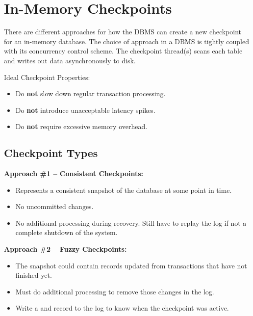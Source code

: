 \documentclass[11pt]{article}
\begin{document}
\maketitle
\thispagestyle{plain}

\section{In-Memory Checkpoints}
There are different approaches for how the DBMS can create a new checkpoint for an 
in-memory database.
The choice of approach in a DBMS is tightly coupled with its concurrency control scheme.
The checkpoint thread(s) scans each table and writes out data asynchronously to disk.

Ideal Checkpoint Properties:~\cite{p1539-ren}
\begin{itemize}
    \item Do \textbf{not} slow down regular transaction processing.
    \item Do \textbf{not} introduce unacceptable latency spikes.
    \item Do \textbf{not} require excessive memory overhead.
\end{itemize}

\subsection{Checkpoint Types}

\textbf{Approach \#1 -- Consistent Checkpoints:}
\begin{itemize}
    \item
    Represents a consistent snapshot of the database at some point in time.
    
    \item
    No uncommitted changes.
    
    \item
    No additional processing during recovery. Still have to replay the log if not a complete 
    shutdown of the system.
\end{itemize}

\textbf{Approach \#2 -- Fuzzy Checkpoints:}
\begin{itemize}
    \item
    The snapshot could contain records updated from transactions that have not finished yet.
    
    \item
    Must do additional processing to remove those changes in the log.
    
    \item
    Write a  and  record to the log to know when the checkpoint was active.
\end{itemize}
\end{document}
